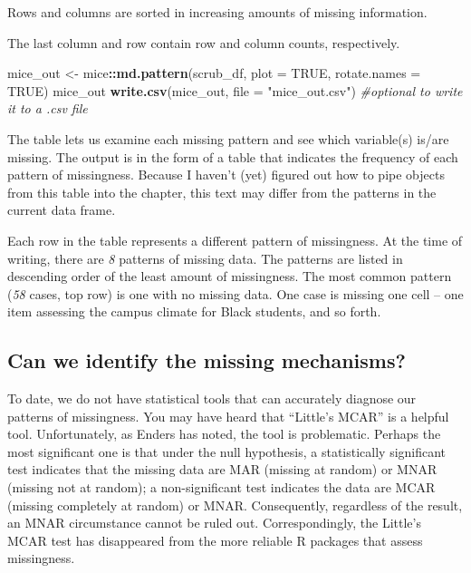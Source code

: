 \documentclass[
  11pt,
]{book}
\newenvironment{Shaded}{\begin{snugshade}}{\end{snugshade}}
\newcommand{\AttributeTok}[1]{\textcolor[rgb]{0.27,0.27,0.27}{#1}}
\newcommand{\CommentTok}[1]{\textcolor[rgb]{0.37,0.37,0.37}{\textit{#1}}}
\newcommand{\ConstantTok}[1]{\textcolor[rgb]{0.37,0.37,0.37}{#1}}
\newcommand{\FunctionTok}[1]{\textcolor[rgb]{0.27,0.27,0.27}{\textbf{#1}}}
\newcommand{\NormalTok}[1]{#1}
\newcommand{\OtherTok}[1]{\textcolor[rgb]{0.37,0.37,0.37}{#1}}
\newcommand{\SpecialCharTok}[1]{\textcolor[rgb]{0.43,0.43,0.43}{\textbf{#1}}}
\newcommand{\StringTok}[1]{\textcolor[rgb]{0.5,0.5,0.5}{#1}}
\begin{document}
Rows and columns are sorted in increasing amounts of missing information.

The last column and row contain row and column counts, respectively.

\begin{Shaded}
\begin{Highlighting}[]
\NormalTok{mice\_out }\OtherTok{\textless{}{-}}\NormalTok{ mice}\SpecialCharTok{::}\FunctionTok{md.pattern}\NormalTok{(scrub\_df, }\AttributeTok{plot =} \ConstantTok{TRUE}\NormalTok{, }\AttributeTok{rotate.names =} \ConstantTok{TRUE}\NormalTok{)}
\NormalTok{mice\_out}
\FunctionTok{write.csv}\NormalTok{(mice\_out, }\AttributeTok{file =} \StringTok{"mice\_out.csv"}\NormalTok{)  }\CommentTok{\#optional to write it to a .csv file}
\end{Highlighting}
\end{Shaded}

The table lets us examine each missing pattern and see which variable(s) is/are missing. The output is in the form of a table that indicates the frequency of each pattern of missingness. Because I haven't (yet) figured out how to pipe objects from this table into the chapter, this text may differ from the patterns in the current data frame.

Each row in the table represents a different pattern of missingness. At the time of writing, there are \emph{8} patterns of missing data. The patterns are listed in descending order of the least amount of missingness. The most common pattern (\emph{58} cases, top row) is one with no missing data. One case is missing one cell -- one item assessing the campus climate for Black students, and so forth.

\hypertarget{can-we-identify-the-missing-mechanisms}{%
\subsection{Can we identify the missing mechanisms?}\label{can-we-identify-the-missing-mechanisms}}

To date, we do not have statistical tools that can accurately diagnose our patterns of missingness. You may have heard that ``Little's MCAR'' is a helpful tool. Unfortunately, as Enders \citeyearpar{enders_applied_2010} has noted, the tool is problematic. Perhaps the most significant one is that under the null hypothesis, a statistically significant test indicates that the missing data are MAR (missing at random) or MNAR (missing not at random); a non-significant test indicates the data are MCAR (missing completely at random) or MNAR. Consequently, regardless of the result, an MNAR circumstance cannot be ruled out. Correspondingly, the Little's MCAR test has disappeared from the more reliable R packages that assess missingness.
\end{document}
